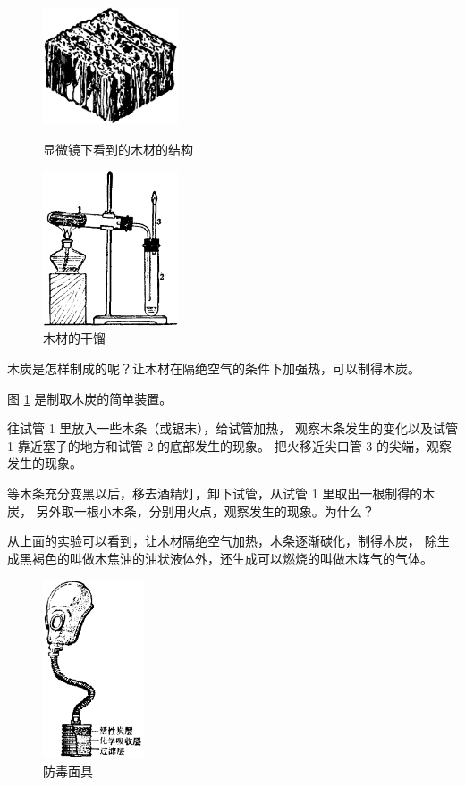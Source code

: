 \begin{figure}[htbp]
    \centering
    \begin{minipage}[b]{7cm}
        \centering
        \includegraphics[width=4cm]{../pic/czhx1-ch3-1}
        \caption{显微镜下看到的木材的结构}\label{fig:3-1}
    \end{minipage}
    \qquad
    \begin{minipage}[b]{7cm}
        \centering
        \includegraphics[width=4cm]{../pic/czhx1-ch3-2}
        \caption{木材的干馏}\label{fig:3-2}
    \end{minipage}
\end{figure}

木炭是怎样制成的呢？让木材在隔绝空气的条件下加强热，可以制得木炭。

\begin{shiyan}
    图 \ref{fig:3-2} 是制取木炭的简单装置。

    往试管 1 里放入一些木条（或锯末），给试管加热，
    观察木条发生的变化以及试管 1 靠近塞子的地方和试管 2 的底部发生的现象。
    把火移近尖口管 3 的尖端，观察发生的现象。

    等木条充分变黑以后，移去酒精灯，卸下试管，从试管 1 里取出一根制得的木炭，
    另外取一根小木条，分别用火点，观察发生的现象。为什么？
\end{shiyan}

从上面的实验可以看到，让木材隔绝空气加热，木条逐渐碳化，制得木炭，
除生成黑褐色的叫做木焦油的油状液体外，还生成可以燃烧的叫做木煤气的气体。

\begin{figure}
    \centering
    \includegraphics[width=3cm]{../pic/czhx1-ch3-3}
    \caption{防毒面具}\label{fig:3-3}
\end{figure}

